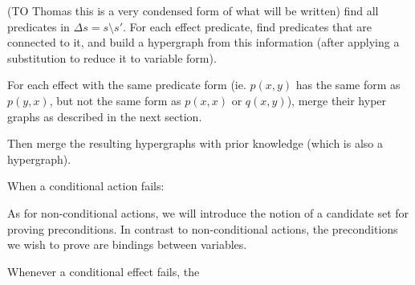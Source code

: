 \documentclass[../Master.tex]{subfiles}
\begin{document}
(TO Thomas this is a very condensed form of what will be written)
find all predicates in $\Delta s = s \setminus s'$. For each effect predicate, find predicates that are connected to it, and build a hypergraph from this information (after applying a substitution to reduce it to variable form). 

For each effect with the same predicate form (ie. $p(x,y)$ has the same form as $p(y,x)$, but not the same form as $p(x,x)$ or $q(x,y)$), merge their hyper graphs as described in the next section. 

Then merge the resulting hypergraphs with prior knowledge (which is also a hypergraph).

When a conditional action fails:

As for non-conditional actions, we will introduce the notion of a candidate set for proving preconditions. In contrast to non-conditional actions, the preconditions we wish to prove are bindings between variables. 

Whenever a conditional effect fails, the 
\end{document}
